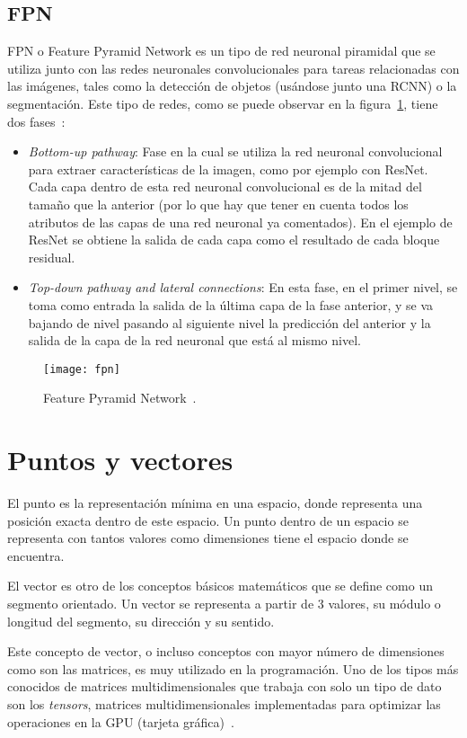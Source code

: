 \subsection{FPN}
FPN o Feature Pyramid Network es un tipo de red neuronal piramidal que se utiliza junto con las redes neuronales convolucionales para tareas relacionadas con las imágenes, tales como la detección de objetos (usándose junto una RCNN) o la segmentación. Este tipo de redes, como se puede observar en la figura~\ref{fig:fpn}, tiene dos fases~\cite{fpn}:
\begin{itemize}
	\item \textit{Bottom-up pathway}: Fase en la cual se utiliza la red neuronal convolucional para extraer características de la imagen, como por ejemplo con ResNet. Cada capa dentro de esta red neuronal convolucional es de la mitad del tamaño que la anterior (por lo que hay que tener en cuenta todos los atributos de las capas de una red neuronal ya comentados). En el ejemplo de ResNet se obtiene la salida de cada capa como el resultado de cada bloque residual.
	\item \textit{Top-down pathway and lateral connections}: En esta fase, en el primer nivel, se toma como entrada la salida de la última capa de la fase anterior, y se va bajando de nivel pasando al siguiente nivel la predicción del anterior y la salida de la capa de la red neuronal que está al mismo nivel.
\end{itemize}
\begin{figure}[h]
	\centering
	\texttt{[image: fpn]}
	\caption[Feature Pyramid Network.]{Feature Pyramid Network~\cite{fpn}.}
	\label{fig:fpn}
\end{figure}

\section{Puntos y vectores}
El punto es la representación mínima en una espacio, donde representa una posición exacta dentro de este espacio. Un punto dentro de un espacio se representa con tantos valores como dimensiones tiene el espacio donde se encuentra.

El vector es otro de los conceptos básicos matemáticos que se define como un segmento orientado. Un vector se representa a partir de 3 valores, su módulo o longitud del segmento, su dirección y su sentido.

Este concepto de vector, o incluso conceptos con mayor número de dimensiones como son las matrices, es muy utilizado en la programación. Uno de los tipos más conocidos de matrices multidimensionales que trabaja con solo un tipo de dato son los \textit{tensors}, matrices multidimensionales implementadas para optimizar las operaciones en la GPU (tarjeta gráfica)~\cite{tensor}. 

